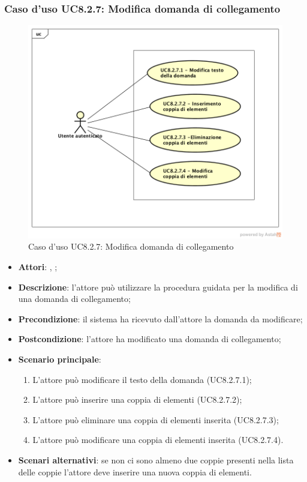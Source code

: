 \subsubsection{Caso d'uso UC8.2.7: Modifica domanda di collegamento}
\label{UC8.2.7}
\begin{figure}[h]
	\centering
	\includegraphics[scale=0.5,keepaspectratio]{UML/UC8_2_7.png}
	\caption{Caso d'uso UC8.2.7: Modifica domanda di collegamento}
\end{figure}
\FloatBarrier
\begin{itemize}
	\item \textbf{Attori}: \uau, \uaupro;
	\item \textbf{Descrizione}: l'attore può utilizzare la procedura guidata per la modifica di una domanda di collegamento; 
	\item \textbf{Precondizione}: il sistema ha ricevuto dall'attore la domanda da modificare; 
	\item \textbf{Postcondizione}: l'attore ha modificato una domanda di collegamento;
	\item \textbf{Scenario principale}: 
	\begin{enumerate}
			\item L'attore può modificare il testo della domanda (UC8.2.7.1);
			\item L'attore può inserire una coppia di elementi (UC8.2.7.2);
			\item L'attore può eliminare una coppia di elementi inserita (UC8.2.7.3);
			\item L'attore può modificare una coppia di elementi inserita (UC8.2.7.4).
		\end{enumerate}
	\item \textbf{Scenari alternativi}: se non ci sono almeno due coppie presenti nella lista delle coppie l'attore deve inserire una nuova coppia di elementi.
\end{itemize}

